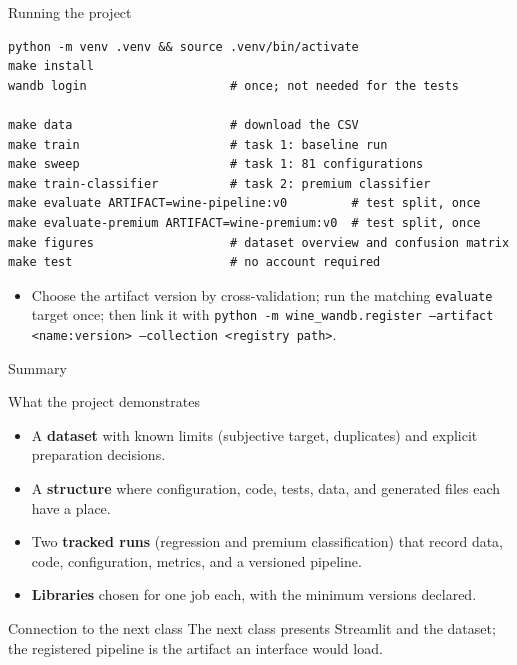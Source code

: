 \begin{frame}[fragile]{Running the project}
\begin{lstlisting}[style=coursepython, language={}, columns=fixed]
python -m venv .venv && source .venv/bin/activate
make install
wandb login                    # once; not needed for the tests

make data                      # download the CSV
make train                     # task 1: baseline run
make sweep                     # task 1: 81 configurations
make train-classifier          # task 2: premium classifier
make evaluate ARTIFACT=wine-pipeline:v0         # test split, once
make evaluate-premium ARTIFACT=wine-premium:v0  # test split, once
make figures                   # dataset overview and confusion matrix
make test                      # no account required
\end{lstlisting}
\vspace{0.3em}
\begin{itemize}\footnotesize
\item Choose the artifact version by cross-validation; run the matching \texttt{evaluate} target once; then link it with \texttt{python -m wine\_wandb.register --artifact <name:version> --collection <registry path>}.
\end{itemize}
\coursefooter
\end{frame}

\begin{frame}{Summary}
\begin{block}{What the project demonstrates}
\footnotesize
\begin{itemize}\setlength{\itemsep}{1pt}
\item A \textbf{dataset} with known limits (subjective target, duplicates) and explicit preparation decisions.
\item A \textbf{structure} where configuration, code, tests, data, and generated files each have a place.
\item Two \textbf{tracked runs} (regression and premium classification) that record data, code, configuration, metrics, and a versioned pipeline.
\item \textbf{Libraries} chosen for one job each, with the minimum versions declared.
\end{itemize}
\end{block}
\vspace{0.3em}
\begin{block}{Connection to the next class}
\footnotesize The next class presents Streamlit and the dataset; the registered pipeline is the artifact an interface would load.
\end{block}
\coursefooter
\end{frame}


